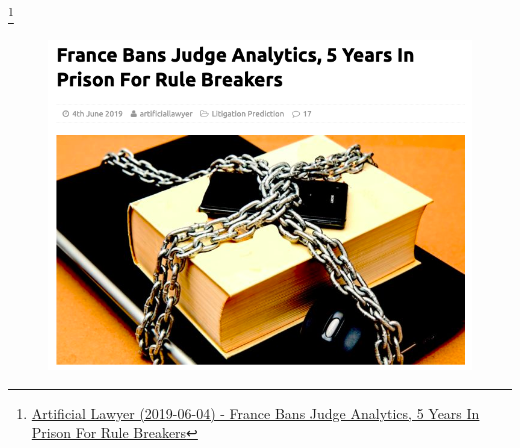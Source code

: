 \documentclass{beamer}\usepackage[]{graphicx}\usepackage[]{xcolor}
\newcommand\blfootnote[1]{%
  \begingroup
  \renewcommand\thefootnote{}\footnote{#1}%
  \addtocounter{footnote}{-1}%
  \endgroup
}
\begin{document}
\begin{frame}{\secname}
\blfootnote{\tiny{\href{https://www.artificiallawyer.com/2019/06/04/france-bans-judge-analytics-5-years-in-prison-for-rule-breakers/}{Artificial Lawyer (2019-06-04) - France Bans Judge Analytics, 5 Years In Prison For Rule Breakers}}}
\begin{figure}
\includegraphics[scale=0.35]{franca}
\end{figure}
\end{frame}
\end{document}
